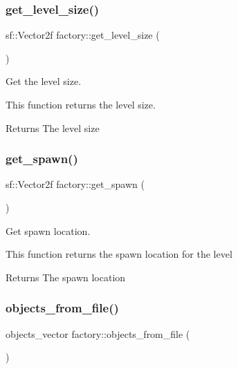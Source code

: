 \subsubsection{\texorpdfstring{get\+\_\+level\+\_\+size()}{get\_level\_size()}}
{\footnotesize\ttfamily sf\+::\+Vector2f factory\+::get\+\_\+level\+\_\+size (\begin{DoxyParamCaption}{ }\end{DoxyParamCaption})}



Get the level size. 

This function returns the level size.

\begin{DoxyReturn}{Returns}
The level size 
\end{DoxyReturn}
\mbox{\label{classfactory_a3c3a039b8f76a947267dbe659166550b}} 
\subsubsection{\texorpdfstring{get\+\_\+spawn()}{get\_spawn()}}
{\footnotesize\ttfamily sf\+::\+Vector2f factory\+::get\+\_\+spawn (\begin{DoxyParamCaption}{ }\end{DoxyParamCaption})}



Get spawn location. 

This function returns the spawn location for the level

\begin{DoxyReturn}{Returns}
The spawn location 
\end{DoxyReturn}
\mbox{\label{classfactory_afb2fad4ac9b0f39b1bfc3f3fc8d218b6}} 
\subsubsection{\texorpdfstring{objects\+\_\+from\+\_\+file()}{objects\_from\_file()}}
{\footnotesize\ttfamily objects\+\_\+vector factory\+::objects\+\_\+from\+\_\+file (\begin{DoxyParamCaption}{ }\end{DoxyParamCaption})}



